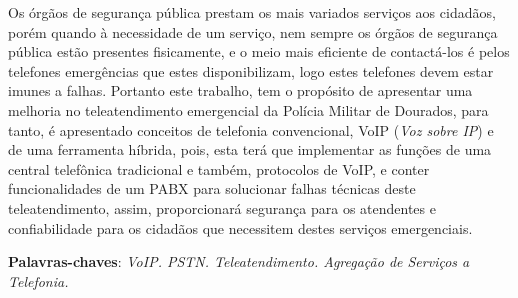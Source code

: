 \setlength{\absparsep}{18pt} %
\begin{resumo}

Os órgãos de segurança pública prestam os mais variados serviços aos cidadãos, porém quando à necessidade de um serviço, nem sempre os órgãos de segurança pública estão presentes fisicamente, e o meio mais eficiente de contactá-los é pelos telefones emergências que estes disponibilizam, logo estes telefones devem estar imunes a falhas. Portanto este trabalho, tem o propósito de apresentar uma melhoria no teleatendimento emergencial da Polícia Militar de Dourados, para tanto, é apresentado conceitos de telefonia convencional, VoIP (\textit{Voz sobre IP}) e de uma ferramenta híbrida, pois, esta terá que implementar as funções de uma central telefônica tradicional e também, protocolos de VoIP, e conter funcionalidades de um PABX para solucionar falhas técnicas deste teleatendimento, assim, proporcionará segurança para os atendentes e confiabilidade para os cidadãos que necessitem destes serviços emergenciais.

 \textbf{Palavras-chaves}: \textit{VoIP. PSTN. Teleatendimento. Agregação de Serviços a Telefonia.}
\end{resumo}
